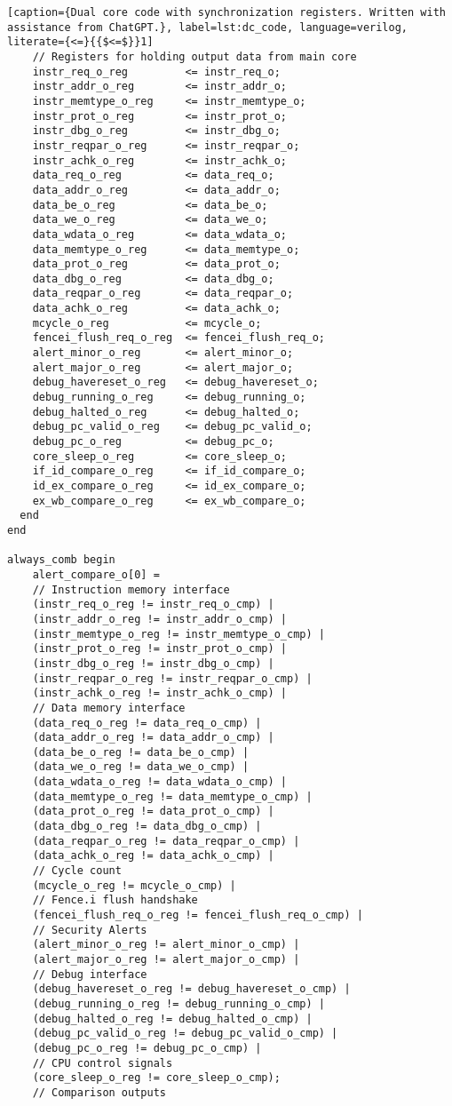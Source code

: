 \begin{lstlisting}[caption={Dual core code with synchronization registers. Written with assistance from ChatGPT.}, label=lst:dc_code, language=verilog, literate={<=}{{$<=$}}1]
    // Registers for holding output data from main core 
    instr_req_o_reg         <= instr_req_o;
    instr_addr_o_reg        <= instr_addr_o;
    instr_memtype_o_reg     <= instr_memtype_o;
    instr_prot_o_reg        <= instr_prot_o;
    instr_dbg_o_reg         <= instr_dbg_o;
    instr_reqpar_o_reg      <= instr_reqpar_o;
    instr_achk_o_reg        <= instr_achk_o;
    data_req_o_reg          <= data_req_o;
    data_addr_o_reg         <= data_addr_o;
    data_be_o_reg           <= data_be_o;
    data_we_o_reg           <= data_we_o;
    data_wdata_o_reg        <= data_wdata_o;
    data_memtype_o_reg      <= data_memtype_o;
    data_prot_o_reg         <= data_prot_o;
    data_dbg_o_reg          <= data_dbg_o;
    data_reqpar_o_reg       <= data_reqpar_o;
    data_achk_o_reg         <= data_achk_o;
    mcycle_o_reg            <= mcycle_o;
    fencei_flush_req_o_reg  <= fencei_flush_req_o;
    alert_minor_o_reg       <= alert_minor_o;
    alert_major_o_reg       <= alert_major_o;
    debug_havereset_o_reg   <= debug_havereset_o;
    debug_running_o_reg     <= debug_running_o;
    debug_halted_o_reg      <= debug_halted_o;
    debug_pc_valid_o_reg    <= debug_pc_valid_o;
    debug_pc_o_reg          <= debug_pc_o;
    core_sleep_o_reg        <= core_sleep_o;
    if_id_compare_o_reg     <= if_id_compare_o;
    id_ex_compare_o_reg     <= id_ex_compare_o;
    ex_wb_compare_o_reg     <= ex_wb_compare_o;
  end 
end

always_comb begin
    alert_compare_o[0] = 
    // Instruction memory interface
    (instr_req_o_reg != instr_req_o_cmp) |
    (instr_addr_o_reg != instr_addr_o_cmp) |
    (instr_memtype_o_reg != instr_memtype_o_cmp) |
    (instr_prot_o_reg != instr_prot_o_cmp) |
    (instr_dbg_o_reg != instr_dbg_o_cmp) |
    (instr_reqpar_o_reg != instr_reqpar_o_cmp) |
    (instr_achk_o_reg != instr_achk_o_cmp) |
    // Data memory interface
    (data_req_o_reg != data_req_o_cmp) |
    (data_addr_o_reg != data_addr_o_cmp) |
    (data_be_o_reg != data_be_o_cmp) |
    (data_we_o_reg != data_we_o_cmp) |
    (data_wdata_o_reg != data_wdata_o_cmp) |
    (data_memtype_o_reg != data_memtype_o_cmp) |
    (data_prot_o_reg != data_prot_o_cmp) |
    (data_dbg_o_reg != data_dbg_o_cmp) |
    (data_reqpar_o_reg != data_reqpar_o_cmp) |
    (data_achk_o_reg != data_achk_o_cmp) |
    // Cycle count
    (mcycle_o_reg != mcycle_o_cmp) |
    // Fence.i flush handshake
    (fencei_flush_req_o_reg != fencei_flush_req_o_cmp) |
    // Security Alerts
    (alert_minor_o_reg != alert_minor_o_cmp) |
    (alert_major_o_reg != alert_major_o_cmp) |
    // Debug interface
    (debug_havereset_o_reg != debug_havereset_o_cmp) |
    (debug_running_o_reg != debug_running_o_cmp) |
    (debug_halted_o_reg != debug_halted_o_cmp) |
    (debug_pc_valid_o_reg != debug_pc_valid_o_cmp) |
    (debug_pc_o_reg != debug_pc_o_cmp) |
    // CPU control signals
    (core_sleep_o_reg != core_sleep_o_cmp);
    // Comparison outputs
    

\end{lstlisting}
